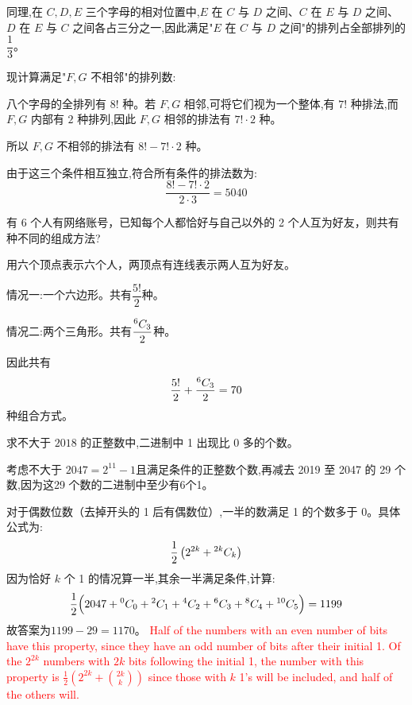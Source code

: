 \begin{questions}
\begin{solution}
        同理,在 $C,D,E$ 三个字母的相对位置中,$E$ 在 $C$ 与 $D$ 之间、$C$ 在 $E$ 与 $D$ 之间、$D$ 在 $E$ 与 $C$ 之间各占三分之一,因此满足"$E$ 在 $C$ 与 $D$ 之间"的排列占全部排列的 $\dfrac{1}{3}$。
        
        现计算满足"$F,G$ 不相邻"的排列数:
        
        八个字母的全排列有 $8!$ 种。若 $F,G$ 相邻,可将它们视为一个整体,有 $7!$ 种排法,而 $F,G$ 内部有 $2$ 种排列,因此 $F,G$ 相邻的排法有 $7! \cdot 2$ 种。
        
        所以 $F,G$ 不相邻的排法有 $8! - 7! \cdot 2$ 种。
        
        由于这三个条件相互独立,符合所有条件的排法数为:
        \[
        \frac{8! - 7! \cdot 2}{2 \cdot 3} = 5040
        \]
    \end{solution}

    \question 有 6 个人有网络账号，已知每个人都恰好与自己以外的 2 个人互为好友，则共有种不同的组成方法?
    \begin{solution}
        用六个顶点表示六个人，两顶点有连线表示两人互为好友。

        情况一:一个六边形。共有$\dfrac{5!}{2}$种。

        情况二:两个三角形。共有$\dfrac{{}^{6}C_{3}}{2}$种。

        因此共有
        \[
        \frac{5!}{2}+\frac{{}^{6}C_{3}}{2}=70
        \]
        种组合方式。
    \end{solution}

\question 求不大于 $2018$ 的正整数中,二进制中 1 出现比 0 多的个数。
\begin{solution}
    考虑不大于 $2047=2^{11}-1$且满足条件的正整数个数,再减去 2019 至 2047 的 29 个数,因为这29 个数的二进制中至少有6个1。

    对于偶数位数（去掉开头的 1 后有偶数位）,一半的数满足 1 的个数多于 0。具体公式为:
    \[
    \frac{1}{2}\left(2^{2k} + {}^{2k}C_{k}\right)
    \]
    因为恰好 $k$ 个 1 的情况算一半,其余一半满足条件,计算:
    \[
    \frac{1}{2}\Big(2047 + {}^{0}C_{0} + {}^{2}C_{1} + {}^{4}C_{2} + {}^{6}C_{3} + {}^{8}C_{4} + {}^{10}C_{5}\Big) = 1199
    \]
    故答案为$1199-29=1170$。
    \textcolor{red}{Half of the numbers with an even number of bits have this property, since they have an odd number of bits after their initial 1. Of the $2^{2k}$ numbers with $2k$ bits following the initial 1, the number with this property is $\frac{1}{2}(2^{2k} + \binom{2k}{k})$ since those with $k$ 1's will be included, and half of the others will.}
\end{solution}


\end{questions}
